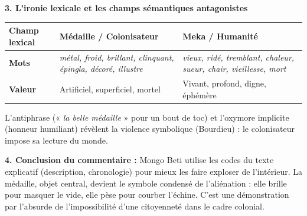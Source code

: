 \documentclass[11pt]{article}
\newcommand{\cle}[1]{{\popxbold\color{popdark}#1}}
\begin{document}
\begin{exoresolu}
    \textbf{3. L'ironie lexicale et les champs sémantiques antagonistes}
    \begin{center}
    \begin{tabularx}{\linewidth}{|l|X|X|}\hline
    \textbf{Champ lexical} & \textbf{Médaille / Colonisateur} & \textbf{Meka / Humanité} \\ \hline
    \textbf{Mots} & \emph{métal, froid, brillant, clinquant, épingla, décoré, illustre} & \emph{vieux, ridé, tremblant, chaleur, sueur, chair, vieillesse, mort} \\ \hline
    \textbf{Valeur} & Artificiel, superficiel, mortel & Vivant, profond, digne, éphémère \\ \hline
    \end{tabularx}
    \end{center}
    L'\cle{antiphrase} (« \emph{la belle médaille} » pour un bout de toc) et l'\cle{oxymore} implicite (honneur humiliant) révèlent la \cle{violence symbolique} (Bourdieu) : le colonisateur impose sa lecture du monde.
    
    \textbf{4. Conclusion du commentaire :} Mongo Beti utilise les codes du \cle{texte explicatif} (description, chronologie) pour mieux les faire exploser de l'intérieur. La médaille, objet central, devient le \cle{symbole condensé} de l'aliénation : elle brille pour masquer le vide, elle pèse pour courber l'échine. C'est une \cle{démonstration par l'absurde} de l'impossibilité d'une citoyenneté dans le cadre colonial.
\end{exoresolu}
\end{document}
